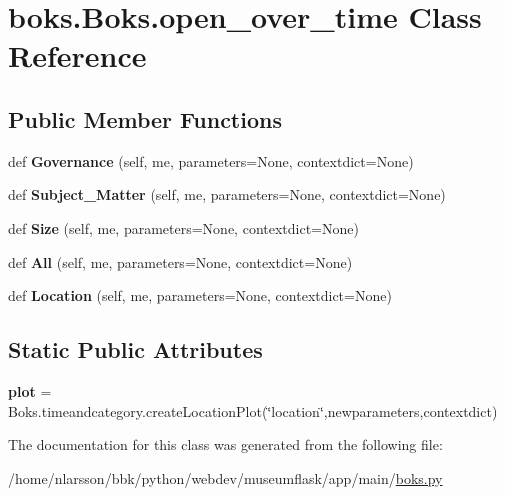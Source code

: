 \hypertarget{classboks_1_1Boks_1_1open__over__time}{}\section{boks.\+Boks.\+open\+\_\+over\+\_\+time Class Reference}
\label{classboks_1_1Boks_1_1open__over__time}
\subsection*{Public Member Functions}
\begin{DoxyCompactItemize}
\item 
\mbox{\label{classboks_1_1Boks_1_1open__over__time_a767186c37298337de4134faa3ccf344f}} 
def {\bfseries Governance} (self, me, parameters=None, contextdict=None)
\item 
\mbox{\label{classboks_1_1Boks_1_1open__over__time_af2102887cb9ca7b91e0a423017f8ee97}} 
def {\bfseries Subject\+\_\+\+Matter} (self, me, parameters=None, contextdict=None)
\item 
\mbox{\label{classboks_1_1Boks_1_1open__over__time_a6481db990899c6fa13e54544781658b6}} 
def {\bfseries Size} (self, me, parameters=None, contextdict=None)
\item 
\mbox{\label{classboks_1_1Boks_1_1open__over__time_a91c1650a44b0552a88f035555c6c4e76}} 
def {\bfseries All} (self, me, parameters=None, contextdict=None)
\item 
\mbox{\label{classboks_1_1Boks_1_1open__over__time_a4db4be50edda650b50d57cd5e14c77b8}} 
def {\bfseries Location} (self, me, parameters=None, contextdict=None)
\end{DoxyCompactItemize}
\subsection*{Static Public Attributes}
\begin{DoxyCompactItemize}
\item 
\mbox{\label{classboks_1_1Boks_1_1open__over__time_a9858dd269ebc0bc1a723625a840ccdd1}} 
{\bfseries plot} = Boks.\+timeandcategory.\+create\+Location\+Plot(\char`\"{}location\char`\"{},newparameters,contextdict)
\end{DoxyCompactItemize}


The documentation for this class was generated from the following file\+:\begin{DoxyCompactItemize}
\item 
/home/nlarsson/bbk/python/webdev/museumflask/app/main/\mbox{\hyperlink{boks_8py}{boks.\+py}}\end{DoxyCompactItemize}
